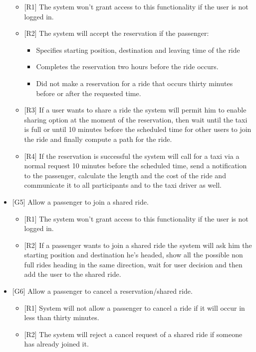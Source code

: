 \begin{itemize}
			\begin{itemize}
				\item {[R1]} The system won't grant access to this functionality if the user is not logged in.
				\item {[R2]} The system will accept the reservation if the passenger: 
				\begin{itemize}
					\item Specifies starting position, destination and leaving time of the ride
					\item Completes the reservation two hours before the ride occurs.
					\item Did not make a reservation for a ride that occurs thirty minutes before or after the requested time.					
				\end{itemize}
				\item {[R3]} If a user wants to share a ride the system will permit him to enable sharing option at the moment of the reservation, then wait until the taxi is full or until 10 minutes before the scheduled time for other users to join the ride and finally compute a path for the ride.
				\item {[R4]} If the reservation is successful the system will call for a taxi via a normal request 10 minutes before the scheduled time, send a notification to the passenger, calculate the length and the cost of the ride and communicate it to all participants and to the taxi driver as well.
			\end{itemize}
		\item {[G5]} Allow a passenger to join a shared ride.
			\begin{itemize}
				\item {[R1]} The system won't grant access to this functionality if the user is not logged in.
				\item {[R2]} If a passenger wants to join a shared ride the system will ask him the starting position and destination he's headed, show all the possible non full rides heading in the same direction, wait for user decision and then add the user to the shared ride.
			\end{itemize}
		\item {[G6]} Allow a passenger to cancel a reservation/shared ride.
			\begin{itemize}
				\item {[R1]} System will not allow a passenger to cancel a ride if it will occur in less than thirty minutes.
				\item {[R2]} The system will reject a cancel request of a shared ride if someone has already joined it.

\end{itemize}
\end{itemize}
